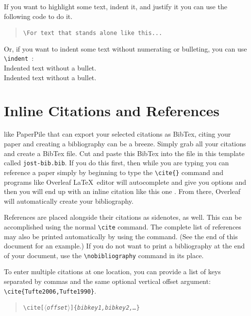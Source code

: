 \documentclass{tufte-handout}
\newcommand{\doccmd}[1]{\texttt{\textbackslash#1}}%
\newcommand{\docopt}[1]{\ensuremath{\langle}\textrm{\textit{#1}}\ensuremath{\rangle}}%
\newcommand{\docarg}[1]{\textrm{\textit{#1}}}%
\newenvironment{docspec}{\begin{quote}\noindent}{\end{quote}}%
\begin{document}
If you want to highlight some text, indent it, and justify it you can use the following code to do it. 

\begin{docspec}
  \doccmd{For text that stands alone like this...}
\end{docspec}

Or, if you want to indent some text without numerating or bulleting, you can use \Verb|\indent |:\\

\indent Indented text without a bullet.\\
\indent Indented text without a bullet.\\

\begin{fullwidth}
\small\itshape\lipsum[1]
\end{fullwidth}

\section{Inline Citations and References}\label{sec:citations} 
 like PaperPile that can export your selected citations as BibTex, citing your paper and creating a bibliography can be a breeze. Simply grab all your citations and create a BibTex file. Cut and paste this BibTex into the file in this template called \verb|jost-bib.bib|. If you do this first, then while you are typing you can reference a paper simply by beginning to type the \verb|\cite{}| command and programs like Overleaf \LaTeX\ editor will autocomplete and give you options and then you will end up with an inline citation like this one \cite{Cabrera2015-stms}. From there, Overleaf will automatically create your bibliography.

References are placed alongside their citations as sidenotes, as well.  This can be accomplished using the normal \Verb|\cite| command. The complete list of references may also be printed automatically by using the \Verb|| command.  (See the end of this document for an example.)  If you do not want to print a bibliography at the end of your document, use the \Verb|\nobibliography| command in its place.  

To enter multiple citations at one location,\cite{Tufte2006,Tufte1990} you can
provide a list of keys separated by commas and the same optional vertical offset argument: \Verb|\cite{Tufte2006,Tufte1990}|.  
\begin{docspec}
  \doccmd{cite[\docopt{offset}]\{\docarg{bibkey1,bibkey2,\ldots}\}}
\end{docspec}
\end{document}
